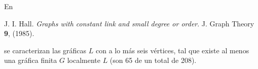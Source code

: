 \documentclass[beamer]{standalone}
\begin{document}
\begin{standaloneframe}
  En

  \bigskip
  J. I. Hall. \emph{Graphs with constant link and small degree or
    order}. J. Graph Theory \textbf{9}, (1985).
  \bigskip

  se caracterizan las gráficas $L$ con a lo más seis vértices, tal que
  existe al menos una gráfica finita $G$ localmente $L$ (son 65 de un
  total de 208).
\end{standaloneframe}
\end{document}
